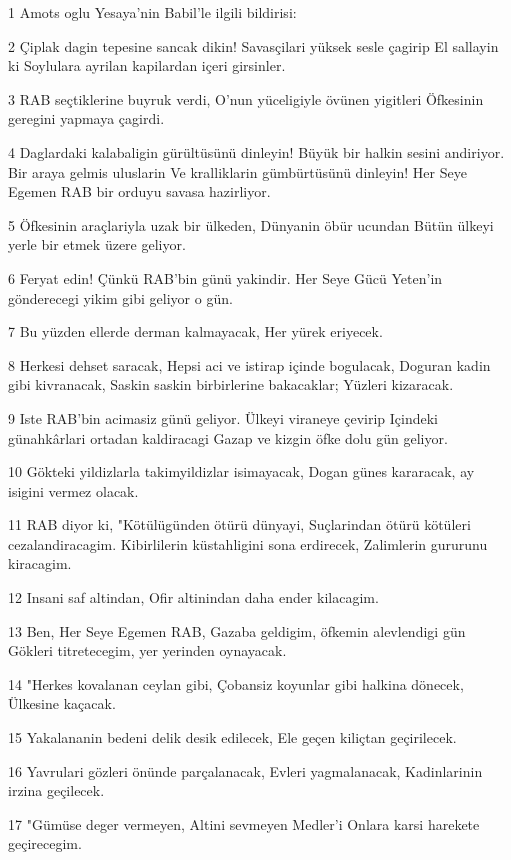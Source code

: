 \par 1 Amots oglu Yesaya'nin Babil'le ilgili bildirisi:
\par 2 Çiplak dagin tepesine sancak dikin! Savasçilari yüksek sesle çagirip El sallayin ki Soylulara ayrilan kapilardan içeri girsinler.
\par 3 RAB seçtiklerine buyruk verdi, O'nun yüceligiyle övünen yigitleri Öfkesinin geregini yapmaya çagirdi.
\par 4 Daglardaki kalabaligin gürültüsünü dinleyin! Büyük bir halkin sesini andiriyor. Bir araya gelmis uluslarin Ve kralliklarin gümbürtüsünü dinleyin! Her Seye Egemen RAB bir orduyu savasa hazirliyor.
\par 5 Öfkesinin araçlariyla uzak bir ülkeden, Dünyanin öbür ucundan Bütün ülkeyi yerle bir etmek üzere geliyor.
\par 6 Feryat edin! Çünkü RAB'bin günü yakindir. Her Seye Gücü Yeten'in gönderecegi yikim gibi geliyor o gün.
\par 7 Bu yüzden ellerde derman kalmayacak, Her yürek eriyecek.
\par 8 Herkesi dehset saracak, Hepsi aci ve istirap içinde bogulacak, Doguran kadin gibi kivranacak, Saskin saskin birbirlerine bakacaklar; Yüzleri kizaracak.
\par 9 Iste RAB'bin acimasiz günü geliyor. Ülkeyi viraneye çevirip Içindeki günahkârlari ortadan kaldiracagi Gazap ve kizgin öfke dolu gün geliyor.
\par 10 Gökteki yildizlarla takimyildizlar isimayacak, Dogan günes kararacak, ay isigini vermez olacak.
\par 11 RAB diyor ki, "Kötülügünden ötürü dünyayi, Suçlarindan ötürü kötüleri cezalandiracagim. Kibirlilerin küstahligini sona erdirecek, Zalimlerin gururunu kiracagim.
\par 12 Insani saf altindan, Ofir altinindan daha ender kilacagim.
\par 13 Ben, Her Seye Egemen RAB, Gazaba geldigim, öfkemin alevlendigi gün Gökleri titretecegim, yer yerinden oynayacak.
\par 14 "Herkes kovalanan ceylan gibi, Çobansiz koyunlar gibi halkina dönecek, Ülkesine kaçacak.
\par 15 Yakalananin bedeni delik desik edilecek, Ele geçen kiliçtan geçirilecek.
\par 16 Yavrulari gözleri önünde parçalanacak, Evleri yagmalanacak, Kadinlarinin irzina geçilecek.
\par 17 "Gümüse deger vermeyen, Altini sevmeyen Medler'i Onlara karsi harekete geçirecegim.
